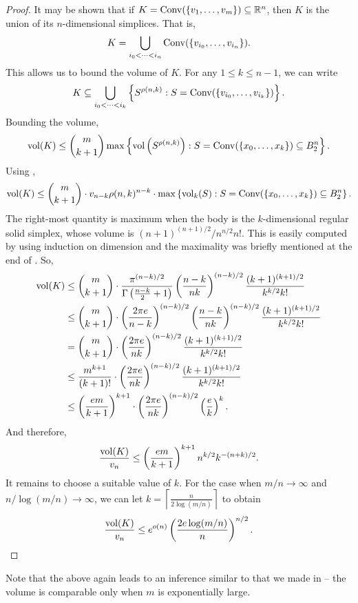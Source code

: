 \begin{proof}
It may be shown that if $K=\operatorname{Conv}(\{v_1,\ldots,v_m\})\subseteq\mathbb{R}^n$, then $K$ is the union of its $n$-dimensional simplices. That is,
\[ K = \bigcup_{i_0 < \cdots < i_n} \operatorname{Conv}(\{v_{i_0},\ldots,v_{i_n}\}). \]
This allows us to bound the volume of $K$. For any $1\leq k\leq n-1$, we can write
\[ K \subseteq \bigcup_{i_0 < \cdots < i_k} \left\{S^{\rho(n,k)} : S=\operatorname{Conv}(\{v_{i_0},\ldots,v_{i_k}\})\right\}. \]
Bounding the volume,
\[ \operatorname{vol}(K) \leq \binom{m}{k+1} \max\left\{\operatorname{vol}\left(S^{\rho(n,k)}\right) : S=\operatorname{Conv}(\{x_0,\ldots,x_k\})\subseteq B_2^n\right\}. \]
Using ,
\[ \operatorname{vol}(K) \leq \binom{m}{k+1} \cdot v_{n-k} \rho(n,k)^{n-k} \cdot \max\left\{\operatorname{vol}_k(S) : S=\operatorname{Conv}(\{x_0,\ldots,x_k\})\subseteq B_2^n\right\}. \]
The right-most quantity is maximum when the body is the $k$-dimensional regular solid simplex, whose volume is $(n+1)^{(n+1)/2}/n^{n/2}n!$. This is easily computed by using induction on dimension and the maximality was briefly mentioned at the end of . So,
\begin{align*}
	\operatorname{vol}(K) &\leq \binom{m}{k+1} \cdot \frac{\pi^{(n-k)/2}}{\Gamma\left(\frac{n-k}{2}+1\right)} \left(\frac{n-k}{nk}\right)^{(n-k)/2} \frac{(k+1)^{(k+1)/2}}{k^{k/2}k!} \\
	&\leq \binom{m}{k+1} \cdot \left(\frac{2\pi e}{n-k}\right)^{(n-k)/2} \left(\frac{n-k}{nk}\right)^{(n-k)/2} \frac{(k+1)^{(k+1)/2}}{k^{k/2}k!} \\
	&= \binom{m}{k+1} \cdot \left(\frac{2\pi e}{nk}\right)^{(n-k)/2} \frac{(k+1)^{(k+1)/2}}{k^{k/2}k!} \\
	&\leq \frac{m^{k+1}}{(k+1)!} \cdot \left(\frac{2\pi e}{nk}\right)^{(n-k)/2} \frac{(k+1)^{(k+1)/2}}{k^{k/2}k!} \\
	&\leq \left(\frac{em}{k+1}\right)^{k+1} \cdot \left(\frac{2\pi e}{nk}\right)^{(n-k)/2} \left(\frac{e}{k}\right)^k.
\end{align*}
And therefore,
\[ \frac{\operatorname{vol} (K)}{v_n} \leq \left(\frac{em}{k+1}\right)^{k+1} n^{k/2} k^{-(n+k)/2}. \]
It remains to choose a suitable value of $k$. For the case when $m/n\to\infty$ and $n/\log(m/n)\to\infty$, we can let $k = \left\lceil \frac{n}{2\log(m/n)} \right\rceil$ to obtain
\[ \frac{\operatorname{vol}(K)}{v_n} \leq e^{o(n)} \left(\frac{2e\log(m/n)}{n}\right)^{n/2}. \]
\end{proof}

Note that the above again leads to an inference similar to that we made in  -- the volume is comparable only when $m$ is exponentially large.\\


